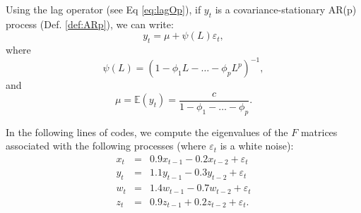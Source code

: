 \documentclass[
  12pt,
]{book}
\newenvironment{Shaded}{\begin{snugshade}}{\end{snugshade}}
\newcommand{\DecValTok}[1]{\textcolor[rgb]{0.00,0.00,0.81}{#1}}
\newcommand{\FloatTok}[1]{\textcolor[rgb]{0.00,0.00,0.81}{#1}}
\newcommand{\FunctionTok}[1]{\textcolor[rgb]{0.00,0.00,0.00}{#1}}
\newcommand{\NormalTok}[1]{#1}
\newcommand{\OtherTok}[1]{\textcolor[rgb]{0.56,0.35,0.01}{#1}}
\newcommand{\SpecialCharTok}[1]{\textcolor[rgb]{0.00,0.00,0.00}{#1}}
\theoremstyle{definition}
\theoremstyle{definition}
\theoremstyle{definition}
\theoremstyle{definition}
\theoremstyle{remark}
\begin{document}
Using the lag operator (see Eq \eqref{eq:lagOp}), if \(y_t\) is a covariance-stationary AR(p) process (Def. \ref{def:ARp}), we can write:
\[
y_t = \mu + \psi(L)\varepsilon_t,
\]
where
\begin{equation}
\psi(L) = (1 - \phi_1 L - \dots - \phi_p L^p)^{-1},
\end{equation}
and
\begin{equation}
\mu = \mathbb{E}(y_t) = \dfrac{c}{1-\phi_1 -\dots - \phi_p}.\label{eq:EAR}
\end{equation}

In the following lines of codes, we compute the eigenvalues of the \(F\) matrices associated with the following processes (where \(\varepsilon_t\) is a white noise):
\begin{eqnarray*}
x_t &=& 0.9 x_{t-1} -0.2 x_{t-2} + \varepsilon_t\\
y_t &=& 1.1 y_{t-1} -0.3 y_{t-2} + \varepsilon_t\\
w_t &=& 1.4 w_{t-1} -0.7 w_{t-2} + \varepsilon_t\\
z_t &=& 0.9 z_{t-1} +0.2 z_{t-2} + \varepsilon_t.
\end{eqnarray*}

\begin{Shaded}
\end{Shaded}
\end{document}
